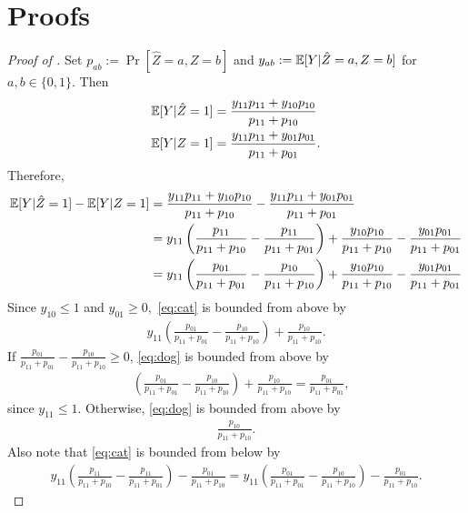 \section{Proofs}\label{sec:proof}

\begin{proof}[Proof of ]
Set $p_{ab}:=\Pr[\hat{Z}=a, Z=b]$ and $y_{ab}:=\mathbb{E}[Y|\hat{Z}=a, Z=b]$
for $a,b\in \{0,1\}.$ Then
\begin{align}
    \mathbb{E}[Y|\hat{Z}=1] &= \frac{y_{11}p_{11} + y_{10}p_{10}}{p_{11}+p_{10}}\\
    \mathbb{E}[Y|Z=1] &= \frac{y_{11}p_{11} + y_{01}p_{01}}{p_{11}+p_{01}}.
\end{align}
Therefore,
\begin{align}
    \mathbb{E}[Y|\hat{Z}=1] - \mathbb{E}[Y|Z=1] &= \frac{y_{11}p_{11} + y_{10}p_{10}}{p_{11}+p_{10}} - \frac{y_{11}p_{11} + y_{01}p_{01}}{p_{11}+p_{01}}\\
    &= y_{11}\left(\frac{p_{11}}{p_{11}+p_{10}} - \frac{p_{11}}{p_{11}+p_{01}}\right) + \frac{y_{10}p_{10}}{p_{11}+p_{10}} - \frac{y_{01}p_{01}}{p_{11}+p_{01}}\\
    &= y_{11}\left(\frac{p_{01}}{p_{11}+p_{01}} - \frac{p_{10}}{p_{11}+p_{10}}\right) + \frac{y_{10}p_{10}}{p_{11}+p_{10}} - \frac{y_{01}p_{01}}{p_{11}+p_{01}}\label{eq:cat}
\end{align}
Since $y_{10}\le 1$ and $y_{01}\ge 0,$ \eqref{eq:cat} is bounded from above by
\begin{align}
    y_{11}\left(\frac{p_{01}}{p_{11}+p_{01}} - \frac{p_{10}}{p_{11}+p_{10}}\right) + \frac{p_{10}}{p_{11} + p_{10}}.\label{eq:dog}
\end{align}
If $\frac{p_{01}}{p_{11}+p_{01}} - \frac{p_{10}}{p_{11}+p_{10}} \ge 0$, \eqref{eq:dog} is bounded from above by
\begin{align}
    &\left(\frac{p_{01}}{p_{11}+p_{01}} - \frac{p_{10}}{p_{11}+p_{10}}\right) + \frac{p_{10}}{p_{11} + p_{10}}
    = \frac{p_{01}}{p_{11}+p_{01}},
\end{align}
since $y_{11} \le 1.$ Otherwise, \eqref{eq:dog}  is bounded from above by
\begin{align}
    \frac{p_{10}}{p_{11}+p_{10}}.
\end{align}
Also note that \eqref{eq:cat} is bounded from below by
\begin{align}
    y_{11}\left(\frac{p_{11}}{p_{11}+p_{10}} - \frac{p_{11}}{p_{11}+p_{01}}\right) - \frac{p_{01}}{p_{11} + p_{10}} = y_{11}\left(\frac{p_{01}}{p_{11}+p_{01}} - \frac{p_{10}}{p_{11}+p_{10}}\right) - \frac{p_{01}}{p_{11} + p_{10}}.\label{eq:dog-2}

\end{align}
\end{proof}
